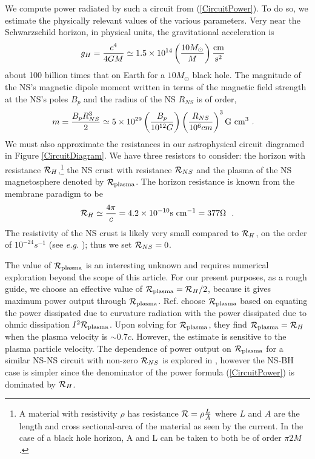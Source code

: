We compute power radiated by such a circuit from
(\ref{CircuitPower}). To do so, we estimate the physically relevant
values of the various parameters.
Very near the Schwarzschild horizon, in physical units, the gravitational acceleration is
\begin{align}
g_H &= \frac{c^4}{4GM}  \simeq  1.5 \times 10^{14} \left(\frac{ 10 M_{\odot} }{M}\right)  \frac{\rm{cm}}{\rm{s}^2}  \nonumber
\end{align}
about 100 billion times that on Earth for a $10 M_\odot$ black hole.
The magnitude of the NS's magnetic dipole moment written in terms
of the magnetic field strength at the NS's poles $B_p$ and
the radius of the NS $R_{NS}$ is of order, 
\begin{align}
\label{mnumbers}
m &= \frac{B_p R^3_{NS}}{2}\simeq 5 \times 10^{29}
\left( \frac{B_p}{10^{12} G}\right) \left(\frac{R_{NS}}{10^6  cm}\right)^3 \rm{G} \ \rm{cm}^3  \ . 
\end{align}
We must also approximate the resistances in our astrophysical circuit diagramed in Figure \ref{CircuitDiagram}. 
We have three resistors to consider: the horizon with resistance
$\mathcal{R}_{H}$,\footnote{A material with resistivity $\rho$ has resistance $\mathcal{R} = \rho \frac{L}{A}$ where $L$ and $A$ are the length and cross sectional-area of the material as seen by the current. In the case of a black hole horizon, A and L can be taken to both be of order $\pi 2M$.} the NS crust with resistance $\mathcal{R}_{NS}$ and the plasma of the NS magnetosphere denoted by
$\mathcal{R}_{\rm{plasma}}$. The horizon resistance is known from the membrane paradigm to be \cite{MPBook}
\begin{equation}
\mathcal{R}_H \simeq \frac{4 \pi}{c} = 4.2 \times 10^{-10} \rm{s}
\ \rm{cm}^{-1}  =  377 \Omega \ \ .
\label{RH}
\end{equation}
The resistivity of the NS crust is likely very small compared to $\mathcal{R}_H$, on the order of $10^{-24} s^{-1}$ (see \textit{e.g.} \citep{Piro:2012}); thus we set $\mathcal{R}_{NS} =0$. 

The value of $\mathcal{R}_{\rm{plasma}}$ is an interesting unknown and
requires numerical exploration beyond the scope of this article. 
For our present purposes, as a rough guide, we choose an effective value of 
$\mathcal{R}_{\rm{plasma}} = \mathcal{R}_H/2$, because it gives maximum power output through $\mathcal{R}_{\rm{plasma}}$. Ref.
\cite{McL:2011} choose $\mathcal{R}_{\rm{plasma}}$ based on equating the power dissipated due to curvature radiation with the power dissipated due to ohmic dissipation $I^2 \mathcal{R}_{\rm{plasma}}$. Upon solving for $\mathcal{R}_{\rm{plasma}}$, they find $\mathcal{R}_{\rm{plasma}} = \mathcal{R}_H$ when the plasma velocity is $\sim 0.7c$. However, the estimate is sensitive to the plasma particle velocity.
The dependence of power output on
$\mathcal{R}_{\rm{plasma}}$ for a similar NS-NS circuit with non-zero
$\mathcal{R}_{NS}$ is explored in \cite{Piro:2012}, however the NS-BH case is simpler since the denominator of the power formula (\ref{CircuitPower}) is dominated by $\mathcal{R}_{H}$.

